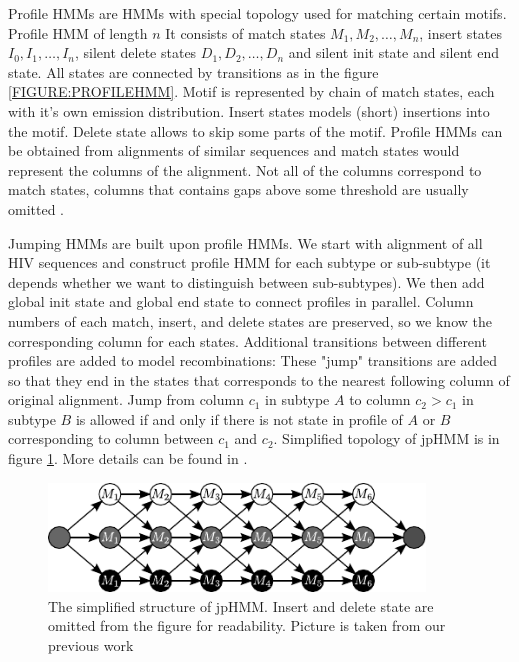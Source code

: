 Profile HMMs are HMMs with special topology used for matching certain
motifs\cite{Durbin1998}. Profile HMM of length $n$ It consists of match states
$M_1,M_2,\dots, M_n$, insert states $I_0, I_1, \dots, I_n$, silent delete states
$D_1, D_2,\dots, D_n$ and silent init state and silent end state. All states are
connected by transitions as in the figure \ref{FIGURE:PROFILEHMM}. Motif is
represented by chain of match states, each with it's own emission distribution.
Insert states models (short) insertions into the motif. Delete state allows to
skip some parts of the motif. Profile HMMs can be obtained from alignments of
similar sequences and match states would represent the columns of the alignment.
Not all of the columns correspond to match states, columns that
contains gaps above some threshold are usually omitted \cite{Durbin1998}. 

Jumping HMMs are built upon profile HMMs. We start with alignment of all HIV
sequences and construct profile HMM for each subtype or sub-subtype (it depends
whether we want to distinguish between sub-subtypes). We then add global init
state and global end state to connect profiles in parallel.  Column numbers of
each match, insert, and delete states are preserved, so we know the
corresponding column for each states. Additional transitions between different
profiles are added to model recombinations: These "jump" transitions are added
so that they end in the states that corresponds to the nearest following column
of original alignment. Jump from column $c_1$ in subtype $A$ to column $c_2>c_1$
in subtype $B$ is allowed if and only if there is not state in profile of $A$ or
$B$ corresponding to column between $c_1$ and $c_2$. Simplified topology of
jpHMM is in figure \ref{app:fig:jpHMM}. More details can be found in
\cite{Schultz2006, Nanasi2010mgr, Nanasi2010}.

\begin{figure}
\begin{center}
\includegraphics[width=10cm]{../figures/jumping_hmm}
\end{center}
\caption[Jumping HMM]{The simplified structure of jpHMM. Insert and delete state
are omitted from the figure for readability. Picture is taken from our previous
work \cite{Nanasi2010mgr}}\label{app:fig:jpHMM}
\end{figure}

